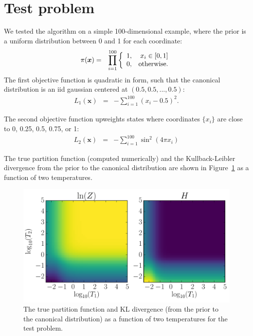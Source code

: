 \documentclass[journal,article,accept,moreauthors,pdftex,12pt,a4paper]{mdpi}
\newcommand{\xx}{\boldsymbol{x}}
\begin{document}
\section{Test problem}

We tested the algorithm on a simple 100-dimensional example, where the
prior is a uniform distribution between 0 and 1 for each coordinate:
\begin{eqnarray}
\pi(\xx) &=& \prod_{i=1}^{100}
\left\{
\begin{array}{lr}
1, & x_i \in [0, 1]\\
0, & \textnormal{otherwise.}
\end{array}
\right.
\end{eqnarray}
The first objective function is quadratic in form, such that the canonical
distribution is an iid gaussian centered at $(0.5, 0.5, ..., 0.5)$:
\begin{eqnarray}
L_1(\xx) &=& -\sum_{i=1}^{100} \left(x_i - 0.5\right)^2.
\end{eqnarray}

The second objective function upweights states where coordinates $\{x_i\}$
are close to 0, 0.25, 0.5, 0.75, or 1:
\begin{eqnarray} 
L_2(\xx) &=& -\sum_{i=1}^{100} \sin^2(4\pi x_i)
\end{eqnarray}

The true partition function (computed numerically) and the Kullback-Leibler
divergence from the prior to the canonical distribution are shown in
Figure~\ref{fig:truth} as a function of two temperatures.

\begin{figure}
\centering
\includegraphics[scale=0.75]{figures/truth.pdf}
\caption{The true partition function and KL divergence (from the prior to
the canonical distribution) as a function of two temperatures for the
test problem.\label{fig:truth}}
\end{figure}
\end{document}
